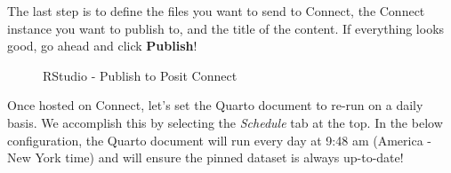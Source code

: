 \documentclass[
  letterpaper,
  DIV=11,
  numbers=noendperiod]{scrreprt}
\begin{document}
The last step is to define the files you want to send to Connect, the
Connect instance you want to publish to, and the title of the content.
If everything looks good, go ahead and click \textbf{Publish}!

\begin{figure}


\caption{\label{fig-rstudio-publish}RStudio - Publish to Posit Connect}

\end{figure}%

Once hosted on Connect, let's set the Quarto document to re-run on a
daily basis. We accomplish this by selecting the \emph{Schedule} tab at
the top. In the below configuration, the Quarto document will run every
day at 9:48 am (America - New York time) and will ensure the pinned
dataset is always up-to-date!
\end{document}
